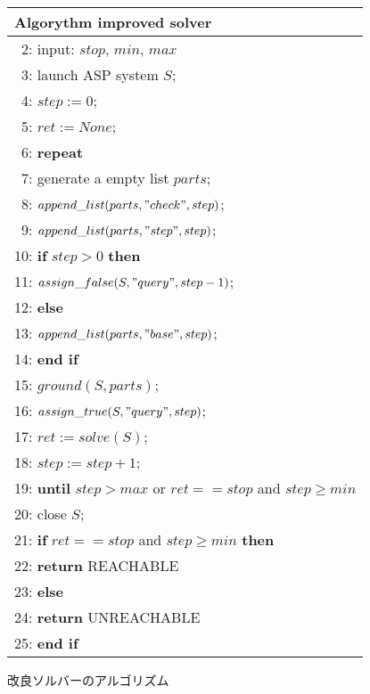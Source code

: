 \begin{figure}[tb]
  \centering
  \begin{tabular}{l}\hline
    \textbf{Algorythm} improved solver\\\hline
    ~2: input: $stop$, $min$, $max$ \\
    ~3: launch ASP system $S$; \\
    ~4: $step := 0$; \\
    ~5: $ret := None$; \\
    ~6: \bf{repeat} \\
    ~7: \quad \quad generate a empty list $parts$; \\
    ~8: \quad \quad $append\_list(parts, "check", step)$; \\
    ~9: \quad \quad $append\_list(parts, "step", step)$; \\
    10: \quad \quad \textbf{if} $step > 0$ \textbf{then} \\
    11: \quad \quad \quad \quad $assign\_false(S, "query", step-1)$; \\
    12: \quad \quad \textbf{else} \\
    13: \quad \quad \quad \quad $append\_list(parts, "base", step)$; \\
    14: \quad \quad \textbf{end if} \\
    15: \quad \quad $ground(S, parts)$; \\
    16: \quad \quad $assign\_true(S, "query", step)$; \\
    17: \quad \quad $ret := solve(S)$; \\
    18: \quad \quad $step := step+1$; \\
    19: \textbf{until} $step > max$ or $ret == stop$ and $step \ge min$\\
    20: close $S$; \\
    21: \textbf{if} $ret == stop$ and $step \ge min$ \textbf{then} \\
    22: \quad \quad \textbf{return} REACHABLE \\
    23: \textbf{else} \\
    24: \quad \quad \textbf{return} UNREACHABLE \\
    25: \textbf{end if} \\ \hline
  \end{tabular}
  \caption{改良ソルバーのアルゴリズム}
  \label{algo:inc_solver}
\end{figure}



